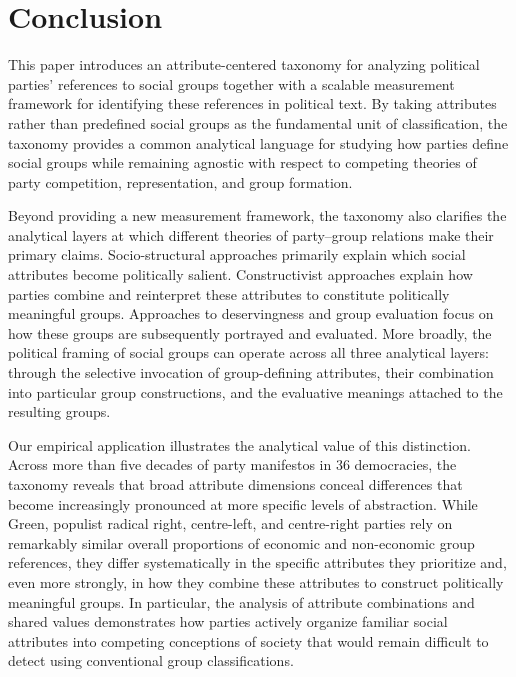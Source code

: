 \documentclass[12pt]{article}
\begin{document}
\section{Conclusion}\label{conclusion}

This paper introduces an attribute-centered taxonomy for analyzing political parties' references to social groups together with a scalable measurement framework for identifying these references in political text.
By taking attributes rather than predefined social groups as the fundamental unit of classification, the taxonomy provides a common analytical language for studying how parties define social groups while remaining agnostic with respect to competing theories of party competition, representation, and group formation.

Beyond providing a new measurement framework, the taxonomy also clarifies the analytical layers at which different theories of party--group relations make their primary claims.
Socio-structural approaches primarily explain which social attributes become politically salient.
Constructivist approaches explain how parties combine and reinterpret these attributes to constitute politically meaningful groups.
Approaches to deservingness and group evaluation focus on how these groups are subsequently portrayed and evaluated.
More broadly, the political framing of social groups can operate across all three analytical layers: through the selective invocation of group-defining attributes, their combination into particular group constructions, and the evaluative meanings attached to the resulting groups.

Our empirical application illustrates the analytical value of this distinction.
Across more than five decades of party manifestos in 36 democracies, the taxonomy reveals that broad attribute dimensions conceal differences that become increasingly pronounced at more specific levels of abstraction.
While Green, populist radical right, centre-left, and centre-right parties rely on remarkably similar overall proportions of economic and non-economic group references, they differ systematically in the specific attributes they prioritize and, even more strongly, in how they combine these attributes to construct politically meaningful groups.
In particular, the analysis of attribute combinations and shared values demonstrates how parties actively organize familiar social attributes into competing conceptions of society that would remain difficult to detect using conventional group classifications.
\end{document}
